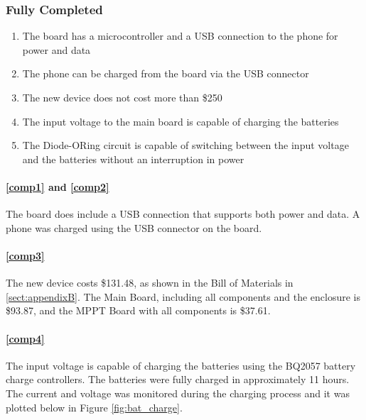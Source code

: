 \documentclass{article}
\numberwithin{figure}{section}
\numberwithin{equation}{section}
\begin{document}
{\subsubsection{Fully Completed}\label{vv-completed}
\begin{enumerate}[align=left,leftmargin=*,labelindent=0em,label=\textbf{Item \thesubsubsection.\arabic*.},itemindent=0em]
    \item \label{comp1} The board has a microcontroller and a USB connection to the phone for power and data
    \item \label{comp2} The phone can be charged from the board via the USB connector
    \item \label{comp3} The new device does not cost more than \$250
    \item \label{comp4} The input voltage to the main board is capable of charging the batteries
    \item \label{comp5} The Diode-ORing circuit is capable of switching between the input voltage and the batteries without an interruption in power
\end{enumerate}

\paragraph{\ref{comp1} and \ref{comp2}}
The board does include a USB connection that supports both power and data. A phone was charged using the USB connector on the board.

\paragraph{\ref{comp3}}
The new device costs \$131.48, as shown in the Bill of Materials in \ref{sect:appendixB}. The Main Board, including all components and the enclosure is \$93.87, and the MPPT Board with all components is \$37.61.

\paragraph{\ref{comp4}}
The input voltage is capable of charging the batteries using the BQ2057 battery charge controllers. The batteries were fully charged in approximately 11 hours. The current and voltage was monitored during the charging process and it was plotted below in Figure \ref{fig:bat_charge}.

}
\end{document}
